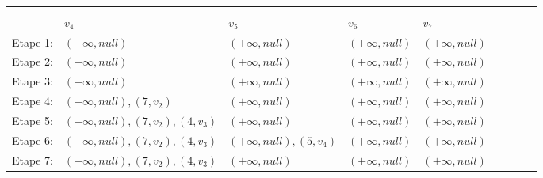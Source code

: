 \begin{exemple}
\begin{table}[]
\begin{tabular}{l|l|l|l|l|l|l|l|l|}
\multicolumn{1}{|l|}{}  		&  &    &    &      \\ \hline
\multicolumn{1}{|l|}{}         & $v_{4}$ &$v_{5}$  & $v_{6}$ &$v_{7}$  \\ \hline
\multicolumn{1}{|l|}{Etape 1:} & $(+\infty,null)$   &$(+\infty,null)$     &$(+\infty,null)$    &$(+\infty,null)$    \\ \hline
\multicolumn{1}{|l|}{Etape 2:} &$(+\infty,null)$    &$(+\infty,null)$    &$(+\infty,null)$    &$(+\infty,null)$    \\ \hline
\multicolumn{1}{|l|}{Etape 3:} &$(+\infty,null)$    &$(+\infty,null)$    &$(+\infty,null)$    &$(+\infty,null)$    \\ \hline
\multicolumn{1}{|l|}{Etape 4:} &$(+\infty,null),(7,v_{2})$    &$(+\infty,null)$    &$(+\infty,null)$    &$(+\infty,null)$    \\ \hline
\multicolumn{1}{|l|}{Etape 5:} &$(+\infty,null),(7,v_{2}),(4,v_{3})$    &$(+\infty,null)$    &$(+\infty,null)$    &$(+\infty,null)$    \\ \hline
\multicolumn{1}{|l|}{Etape 6:} &$(+\infty,null),(7,v_{2}),(4,v_{3})$     &$(+\infty,null),(5,v_{4})$    &$(+\infty,null)$    &$(+\infty,null)$    \\ \hline
\multicolumn{1}{|l|}{Etape 7:} &$(+\infty,null),(7,v_{2}),(4,v_{3})$     &$(+\infty,null)$    &$(+\infty,null)$    &$(+\infty,null)$    \\ \hline

\end{tabular}




\end{table}
	
\end{exemple}	 

\clearpage